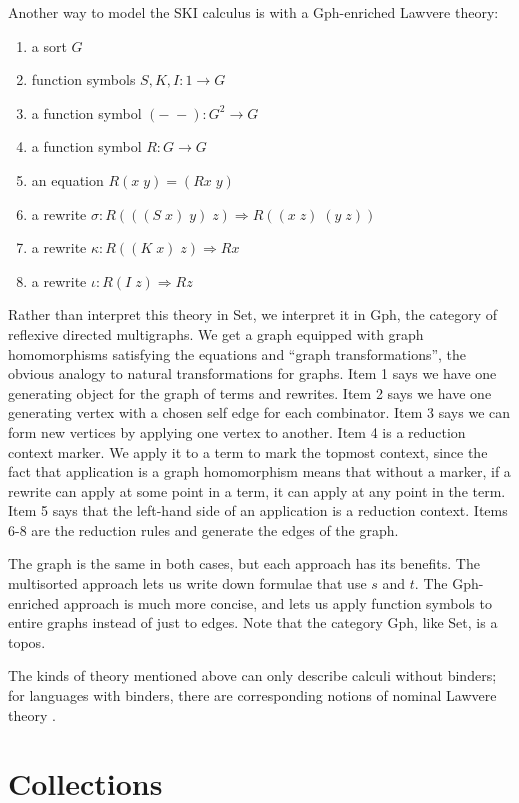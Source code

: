 \documentclass[sigplan,9pt,review,anonymous]{acmart}\settopmatter{printfolios=true,printccs=false,printacmref=false}
\newcommand{\maps}{\colon}
\begin{document}
Another way to model the SKI calculus is with a Gph-enriched Lawvere theory:
\begin{enumerate}
  \item a sort $G$
  \item function symbols $S,K,I\maps 1 \to G$
  \item a function symbol $(-\;-)\maps G^2 \to G$
  \item a function symbol $R\maps G \to G$
  \item an equation $R(x\; y) = (Rx\; y)$
  \item a rewrite $\sigma\maps R(((S\; x)\; y)\; z) \Rightarrow R((x\; z)\;(y\; z))$
  \item a rewrite $\kappa\maps R((K\; x)\; z) \Rightarrow Rx$
  \item a rewrite $\iota\maps R(I\; z) \Rightarrow Rz$
\end{enumerate}
Rather than interpret this theory in Set, we interpret it in Gph, the category of reflexive directed multigraphs.  We get a graph equipped with graph homomorphisms satisfying the equations and ``graph transformations'', the obvious analogy to natural transformations for graphs.  Item 1 says we have one generating object for the graph of terms and rewrites. Item 2 says we have one generating vertex with a chosen self edge for each combinator.  Item 3 says we can form new vertices by applying one vertex to another.  Item 4 is a reduction context marker.  We apply it to a term to mark the topmost context, since the fact that application is a graph homomorphism means that without a marker, if a rewrite can apply at some point in a term, it can apply at any point in the term.  Item 5 says that the left-hand side of an application is a reduction context.  Items 6-8 are the reduction rules and generate the edges of the graph.

The graph is the same in both cases, but each approach has its benefits.  The multisorted approach lets us write down formulae that use $s$ and $t$.  The Gph-enriched approach is much more concise, and lets us apply function symbols to entire graphs instead of just to edges.  Note that the category Gph, like Set, is a topos.

The kinds of theory mentioned above can only describe calculi without binders; for languages with binders, there are corresponding notions of nominal Lawvere theory \cite{GabbayPitts, Clouston}.

\section{Collections}
\end{document}
